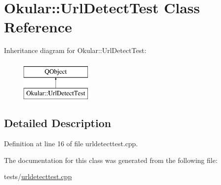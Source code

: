 \hypertarget{classOkular_1_1UrlDetectTest}{\section{Okular\+:\+:Url\+Detect\+Test Class Reference}
\label{classOkular_1_1UrlDetectTest}
}
Inheritance diagram for Okular\+:\+:Url\+Detect\+Test\+:\begin{figure}[H]
\begin{center}
\leavevmode
\includegraphics[height=2.000000cm]{classOkular_1_1UrlDetectTest}
\end{center}
\end{figure}


\subsection{Detailed Description}


Definition at line 16 of file urldetecttest.\+cpp.



The documentation for this class was generated from the following file\+:\begin{DoxyCompactItemize}
\item 
tests/\hyperlink{urldetecttest_8cpp}{urldetecttest.\+cpp}\end{DoxyCompactItemize}
